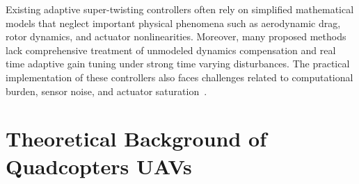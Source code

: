 \noindent  Existing adaptive super-twisting controllers often rely on simplified mathematical models that neglect important physical phenomena such as aerodynamic drag, rotor dynamics, and actuator nonlinearities. Moreover, many proposed methods lack comprehensive treatment of unmodeled dynamics compensation and real time adaptive gain tuning under strong time varying disturbances. The practical implementation of these controllers also faces challenges related to computational burden, sensor noise, and actuator saturation~\cite{wang2023robust,sun2023attitude}.



\section{Theoretical Background of Quadcopters UAVs}

